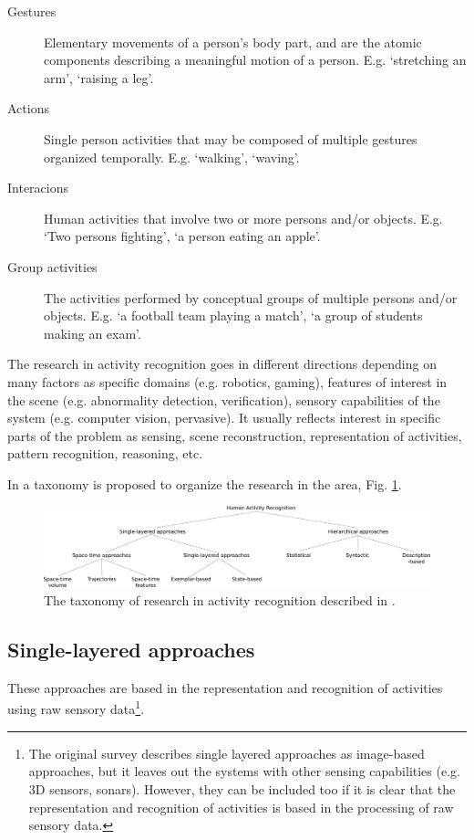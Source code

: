\documentclass[a4paper, 12pt, openany, oneside]{book}
\begin{document}
\begin{description}
\item[Gestures] Elementary movements of a person's body part, and are the atomic components describing a meaningful motion of a person. 
E.g. `stretching an arm', `raising a leg'.
\item[Actions] Single person activities that may be composed of multiple gestures organized temporally. 
E.g. `walking', `waving'.
\item[Interacions] Human activities that involve two or more persons and/or objects. 
E.g. `Two persons fighting', `a person eating an apple'.
\item[Group activities] The activities performed by conceptual groups of multiple persons and/or objects. 
E.g. `a football team playing a match', `a group of students making an exam'.
\end{description}

The research in activity recognition goes in different directions depending on many factors as specific domains (e.g. robotics, gaming), features of interest in the scene (e.g. abnormality detection, verification), sensory capabilities of the system (e.g. computer vision, pervasive). It usually reflects interest in specific parts of the problem as sensing, scene reconstruction, representation of activities, pattern recognition, reasoning, etc.

In \citep{Aggarwal11_HumanActivity} a taxonomy is proposed to organize the research in the area, Fig. \ref{fig:taxonomy}.  

\begin{figure}[h]
\centering
\includegraphics[width=\textwidth]{fig/img_Aggarwal_Taxonomy.pdf}
\caption{The taxonomy of research in activity recognition described in \cite{Aggarwal11_HumanActivity}.}
\label{fig:taxonomy}
\end{figure}

\subsection{Single-layered approaches}
These approaches are based in the representation and recognition of activities using raw sensory data\footnote{The original survey \citep{Aggarwal11_HumanActivity} describes single layered approaches as image-based approaches, but it leaves out the systems with other sensing capabilities (e.g. 3D sensors, sonars). However, they can be included too if it is clear that the representation and recognition of activities is based in the processing of raw sensory data.}.
\end{document}
